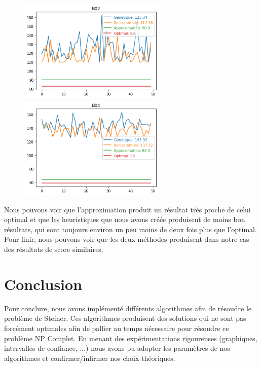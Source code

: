 \documentclass{article}
\begin{document}
\begin{figure}[H]
	\centerline{ \includegraphics[width=7cm]{images/B02perf.png} \includegraphics[width=7cm]{images/B04perf.png}} 
\end{figure}

Nous pouvons voir que l'approximation produit un résultat très proche de celui optimal et que les heuristiques que nous avons créée produisent de moins bon résultats, qui sont toujours environ un peu moins de deux fois plus que l'optimal. Pour finir, nous pouvons voir que les deux méthodes produisent dans notre cas des résultats de score similaires.

\section{Conclusion}
Pour conclure, nous avons implémenté différents algorithmes afin de résoudre le problème de Steiner. Ces algorithmes produisent des solutions qui ne sont pas forcément optimales afin de pallier au temps nécessaire pour résoudre ce problème NP Complet. En menant des expérimentations rigoureuses (graphiques, intervalles de confiance, ...) nous avons pu adapter les paramètres de nos algorithmes et confirmer/infirmer nos choix théoriques.
\end{document}
